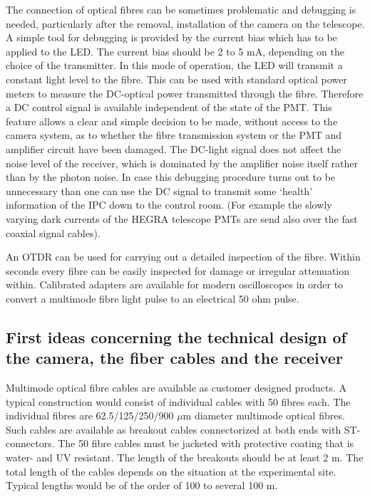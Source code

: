 The connection of optical fibres can be sometimes problematic and debugging
is needed, particularly after the removal, installation of the camera on the
telescope. A simple tool for debugging is provided by the current bias which
has to be applied to the LED. The current bias should be 2 to 5 mA,
depending on the choice of the transmitter. In this mode of operation, the
LED will transmit a constant light level to the fibre. This can be used with
standard optical power meters to measure the DC-optical power transmitted
through the fibre. Therefore a DC control signal is available independent of
the state of the PMT. This feature allows a clear and simple decision to be
made, without access to the camera system, as to whether the fibre
transmission system or the PMT and amplifier circuit have been damaged. The
DC-light signal does not affect the noise level of the receiver, which is
dominated by the amplifier noise itself rather than by the photon noise. In
case this debugging procedure turns out to be unnecessary than one can use
the DC signal to transmit some `health' information of the IPC down to the
control room. (For example the slowly varying dark currents of the HEGRA
telescope PMTs are send also over the fast coaxial signal cables).

An OTDR can be used for carrying out a detailed inspection of the fibre.
Within seconds every fibre can be easily inspected for damage or irregular
attenuation within. Calibrated adapters are available for modern
oscilloscopes in order to convert a multimode fibre light pulse to an
electrical 50 ohm pulse.

\subsection{First ideas concerning the technical design of the camera, the
fiber cables and the receiver}


\medskip Multimode optical fibre cables are available as customer designed
products. A typical construction would consist of individual cables with 50
fibres each. The individual fibres are 62.5/125/250/900 $\mu$m diameter
multimode optical fibres. Such cables are available as breakout cables
connectorized at both ends with ST-connectors. The 50 fibre cables must be
jacketed with protective coating that is water- and UV resistant. The length
of the breakouts should be at least 2 m. The total length of the cables
depends on the situation at the experimental site. Typical lengths would be
of the order of 100 to several 100 m.

